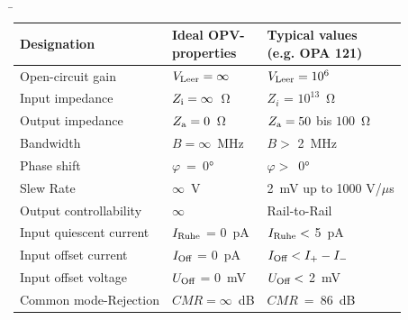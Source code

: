 \begin{frame}
         \b{
            \begin{tabular}{|L{4cm}|L{4cm}|L{4cm}|}
                \hline
                \textbf{Designation} & \textbf{Ideal OPV- \newline properties} & \textbf{Typical values \newline (e.g. OPA 121)} \\ 
                \hline
                Open-circuit gain & $V_{\textnormal{Leer}} = \infty$ & $V_{\textnormal{Leer}} = 10^6$\\
                \hline
                Input impedance & $Z_{\textnormal{i}} = \infty$~Ω & $Z_i$ = $10^{13}$~Ω\\  
                \hline
                Output impedance & $Z_{\textnormal{a}} = 0$~Ω & $Z_{\textnormal{a}} = 50$ bis $100$~Ω\\
                \hline
                Bandwidth & $B = \infty$~MHz & $B >$ 2~MHz\\   
                \hline
                Phase shift & $\varphi$~=~0° & $\varphi >$~0°\\
                \hline
                Slew Rate & $\infty$~V & 2~mV up to 1000 V/$\mu$s\\
                \hline
                Output controllability & $\infty$ & Rail-to-Rail\\
                \hline
                Input quiescent current & $I_{\textnormal{Ruhe}}$ = 0~pA & $I_{\textnormal{Ruhe}} <$ 5~pA\\
                \hline
                Input offset current & $I_{\textnormal{Off}}$ = 0~pA & $I_{\textnormal{Off}} < I_+-I_-$\\
                \hline
                Input offset voltage & $U_{\textnormal{Off}}$ = 0~mV & $U_{\textnormal{Off}} < $ 2~mV\\
                \hline
                Common mode-\linebreak Rejection & $CMR = \infty$~dB  & $CMR$~=~86~dB\\
                \hline
            \end{tabular}}
\end{frame}

